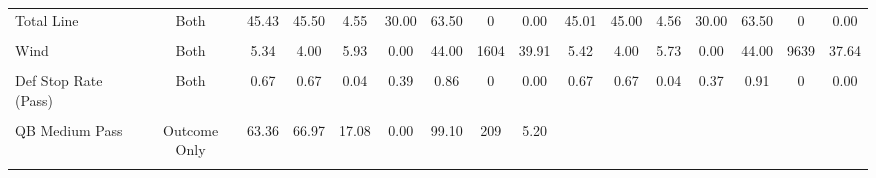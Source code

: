 \documentclass[
]{article}
\begin{document}
\begin{table}[!h]
{\begin{tabular}[t]{lccccccccccccccc}
\addlinespace
Total Line & Both & 45.43 & 45.50 & 4.55 & 30.00 & 63.50 & 0 & 0.00 & 45.01 & 45.00 & 4.56 & 30.00 & 63.50 & 0 & 0.00\\
\cellcolor{gray!10}{Temperature} & \cellcolor{gray!10}{Both} & \cellcolor{gray!10}{60.84} & \cellcolor{gray!10}{70.00} & \cellcolor{gray!10}{15.35} & \cellcolor{gray!10}{6.00} & \cellcolor{gray!10}{93.00} & \cellcolor{gray!10}{0} & \cellcolor{gray!10}{0.00} & \cellcolor{gray!10}{61.73} & \cellcolor{gray!10}{70.00} & \cellcolor{gray!10}{15.14} & \cellcolor{gray!10}{6.00} & \cellcolor{gray!10}{97.00} & \cellcolor{gray!10}{0} & \cellcolor{gray!10}{0.00}\\
Wind & Both & 5.34 & 4.00 & 5.93 & 0.00 & 44.00 & 1604 & 39.91 & 5.42 & 4.00 & 5.73 & 0.00 & 44.00 & 9639 & 37.64\\
\cellcolor{gray!10}{Def Stop Rate (Run)} & \cellcolor{gray!10}{Both} & \cellcolor{gray!10}{0.75} & \cellcolor{gray!10}{0.75} & \cellcolor{gray!10}{0.04} & \cellcolor{gray!10}{0.47} & \cellcolor{gray!10}{1.00} & \cellcolor{gray!10}{0} & \cellcolor{gray!10}{0.00} & \cellcolor{gray!10}{0.75} & \cellcolor{gray!10}{0.75} & \cellcolor{gray!10}{0.05} & \cellcolor{gray!10}{0.47} & \cellcolor{gray!10}{1.00} & \cellcolor{gray!10}{0} & \cellcolor{gray!10}{0.00}\\
Def Stop Rate (Pass) & Both & 0.67 & 0.67 & 0.04 & 0.39 & 0.86 & 0 & 0.00 & 0.67 & 0.67 & 0.04 & 0.37 & 0.91 & 0 & 0.00\\
\addlinespace
\cellcolor{gray!10}{QB Short Pass} & \cellcolor{gray!10}{Outcome Only} & \cellcolor{gray!10}{62.06} & \cellcolor{gray!10}{64.84} & \cellcolor{gray!10}{13.90} & \cellcolor{gray!10}{0.00} & \cellcolor{gray!10}{90.20} & \cellcolor{gray!10}{164} & \cellcolor{gray!10}{4.08} & \cellcolor{gray!10}{} & \cellcolor{gray!10}{} & \cellcolor{gray!10}{} & \cellcolor{gray!10}{} & \cellcolor{gray!10}{} & \cellcolor{gray!10}{} & \cellcolor{gray!10}{}\\
QB Medium Pass & Outcome Only & 63.36 & 66.97 & 17.08 & 0.00 & 99.10 & 209 & 5.20 &  &  &  &  &  &  & \\
\cellcolor{gray!10}{QB Deep Pass} & \cellcolor{gray!10}{Outcome Only} & \cellcolor{gray!10}{64.38} & \cellcolor{gray!10}{68.19} & \cellcolor{gray!10}{18.05} & \cellcolor{gray!10}{0.00} & \cellcolor{gray!10}{96.40} & \cellcolor{gray!10}{220} & \cellcolor{gray!10}{5.47} & \cellcolor{gray!10}{} & \cellcolor{gray!10}{} & \cellcolor{gray!10}{} & \cellcolor{gray!10}{} & \cellcolor{gray!10}{} & \cellcolor{gray!10}{} & \cellcolor{gray!10}{}\\

\end{tabular}}
\end{table}
\end{document}
